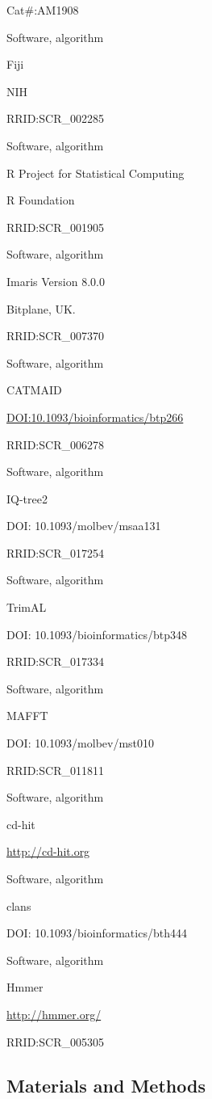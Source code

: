 \documentclass[
  10pt,
  onecolumn]{article}
\begin{document}
Cat\#:AM1908

Software, algorithm

Fiji

NIH

RRID:SCR\_002285

Software, algorithm

R Project for Statistical Computing

R Foundation

RRID:SCR\_001905

Software, algorithm

Imaris Version 8.0.0

Bitplane, UK.

RRID:SCR\_007370

Software, algorithm

CATMAID

\url{DOI:10.1093/bioinformatics/btp266}

RRID:SCR\_006278

Software, algorithm

IQ-tree2

DOI: 10.1093/molbev/msaa131

RRID:SCR\_017254

Software, algorithm

TrimAL

DOI: 10.1093/bioinformatics/btp348

RRID:SCR\_017334

Software, algorithm

MAFFT

DOI: 10.1093/molbev/mst010

RRID:SCR\_011811

Software, algorithm

cd-hit

\url{http://cd-hit.org}

Software, algorithm

clans

DOI: 10.1093/bioinformatics/bth444

Software, algorithm

Hmmer

\url{http://hmmer.org/}

RRID:SCR\_005305

\hypertarget{materials-and-methods}{%
\subsection{Materials and Methods}\label{materials-and-methods}}
\end{document}
